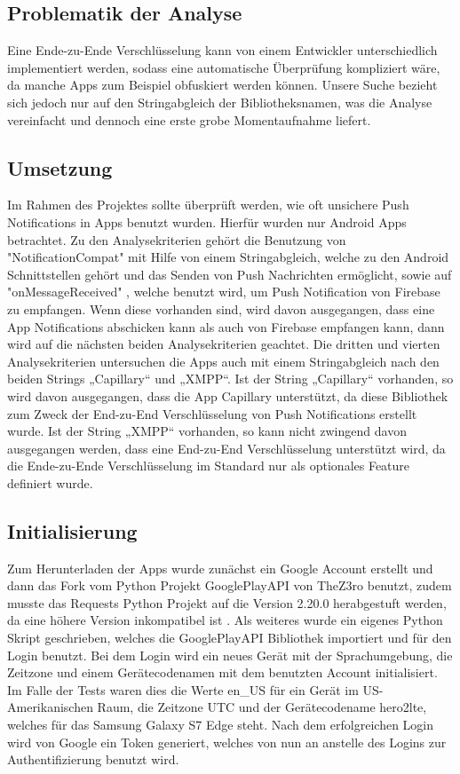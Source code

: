 \documentclass[sigconf]{acmart}
\begin{document}
\subsection{Problematik der Analyse}
Eine Ende-zu-Ende Verschlüsselung kann von einem Entwickler unterschiedlich implementiert werden,
sodass eine automatische Überprüfung kompliziert wäre, da manche Apps zum Beispiel obfuskiert werden können.
Unsere Suche bezieht sich jedoch nur auf den Stringabgleich der Bibliotheksnamen, was die Analyse vereinfacht
und dennoch eine erste grobe Momentaufnahme liefert.

\subsection{Umsetzung}
Im Rahmen des Projektes sollte überprüft werden, wie oft unsichere Push 
Notifications in Apps benutzt wurden. Hierfür wurden nur Android Apps 
betrachtet. Zu den Analysekriterien gehört die Benutzung von 
"NotificationCompat" \cite{google} mit Hilfe von einem Stringabgleich, welche zu den 
Android Schnittstellen gehört und das Senden von Push Nachrichten ermöglicht, sowie auf "onMessageReceived" \cite{firebase3}, welche 
benutzt wird, um Push Notification von Firebase zu empfangen. 
Wenn diese vorhanden sind, wird davon ausgegangen, dass eine App 
Notifications abschicken kann als auch von Firebase empfangen kann, dann wird auf die nächsten beiden 
Analysekriterien geachtet.
Die dritten und vierten Analysekriterien untersuchen die Apps auch mit 
einem Stringabgleich nach den beiden Strings „Capillary“ und „XMPP“. Ist 
der String „Capillary“ vorhanden, so wird davon ausgegangen, dass die App 
Capillary unterstützt, da diese Bibliothek zum Zweck der End-zu-End 
Verschlüsselung von Push Notifications erstellt wurde. Ist der String „XMPP“ 
vorhanden, so kann nicht zwingend davon ausgegangen werden, dass eine 
End-zu-End Verschlüsselung unterstützt wird, da die Ende-zu-Ende 
Verschlüsselung im Standard nur als optionales Feature definiert wurde.

\subsection{Initialisierung}
Zum Herunterladen der Apps wurde zunächst ein Google Account erstellt und dann
das Fork vom Python Projekt GooglePlayAPI 
von TheZ3ro \cite{googleplayapi} benutzt, zudem musste das Requests Python Projekt auf die Version 
2.20.0 herabgestuft werden, da eine höhere Version inkompatibel ist \cite{googleplayapi1}. 
Als weiteres wurde ein eigenes Python Skript geschrieben, welches die 
GooglePlayAPI Bibliothek importiert und für den Login benutzt. Bei dem Login 
wird ein neues Gerät mit der Sprachumgebung, die Zeitzone und einem 
Gerätecodenamen mit dem benutzten Account initialisiert. Im Falle der Tests 
waren dies die Werte en\_US für ein Gerät im US-Amerikanischen Raum, die 
Zeitzone UTC und der Gerätecodename hero2lte, welches für das Samsung 
Galaxy S7 Edge steht. Nach dem erfolgreichen Login wird von Google ein Token generiert, 
welches von nun an anstelle des Logins zur Authentifizierung benutzt wird.
\end{document}
